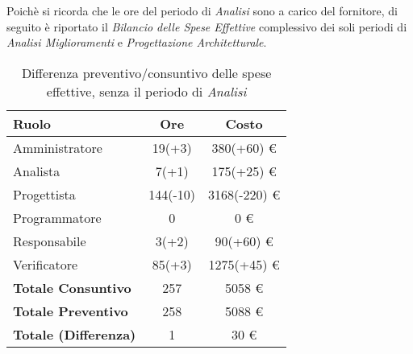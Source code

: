 Poichè si ricorda che le ore del periodo di \textit{Analisi} sono a carico del fornitore, di seguito è riportato il \textit{Bilancio delle Spese Effettive} complessivo dei soli periodi di \textit{Analisi Miglioramenti} e \textit{Progettazione Architetturale}.

\begin{table}[H]
	\centering
	\begin{tabular}{ l c c }
		\textbf{Ruolo} & \textbf{Ore} & \textbf{Costo} \\
		\hline
		Amministratore & 19(+3) & 380(+60) \euro{} \\
		Analista & 7(+1) & 175(+25) \euro{} \\
		Progettista & 144(-10) & 3168(-220) \euro{} \\
		Programmatore & 0 & 0 \euro{} \\
		Responsabile & 3(+2) & 90(+60) \euro{} \\
		Verificatore & 85(+3) & 1275(+45) \euro{} \\
		\hline
		\textbf{Totale Consuntivo} & 257 & 5058 \euro{} \\
		\hline
		\textbf{Totale Preventivo} & 258 & 5088 \euro{} \\
		\hline
		\textbf{Totale (Differenza)} & 1 & 30 \euro{} \\
		\hline
	\end{tabular}
	\caption{Differenza preventivo/consuntivo delle spese effettive, senza il periodo di \textit{Analisi}}
\end{table}

\newpage